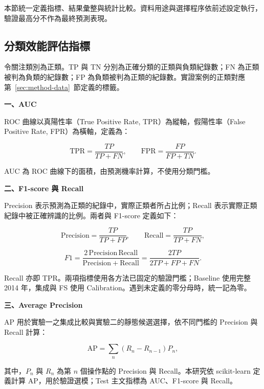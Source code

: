 本節統一定義指標、結果彙整與統計比較。資料用途與選擇程序依前述設定執行，驗證最高分不作為最終預測表現。

\subsection{分類效能評估指標}

令關注類別為正類。TP 與 TN 分別為正確分類的正類與負類紀錄數；FN 為正類被判為負類的紀錄數；FP 為負類被判為正類的紀錄數。實證案例的正類對應第~\ref{sec:method-data}~節定義的標籤。

\textbf{一、AUC}

ROC 曲線以真陽性率（True Positive Rate, TPR）為縱軸，假陽性率（False Positive Rate, FPR）為橫軸，定義為：

\begin{equation}\label{eq:method-roc}
\mathrm{TPR}=\frac{TP}{TP+FN},\qquad
\mathrm{FPR}=\frac{FP}{FP+TN}.
\end{equation}

AUC 為 ROC 曲線下的面積，由預測機率計算，不使用分類門檻。

\textbf{二、F1-score 與 Recall}

Precision 表示預測為正類的紀錄中，實際正類者所占比例；Recall 表示實際正類紀錄中被正確辨識的比例。兩者與 F1-score 定義如下：

\begin{equation}\label{eq:recall}
\mathrm{Precision}=\frac{TP}{TP+FP},\qquad
\mathrm{Recall}=\frac{TP}{TP+FN},
\end{equation}

\begin{equation}\label{eq:method-f1}
F1=\frac{2\,\mathrm{Precision}\,\mathrm{Recall}}
{\mathrm{Precision}+\mathrm{Recall}}
=\frac{2TP}{2TP+FP+FN}.
\end{equation}

Recall 亦即 TPR。兩項指標使用各方法已固定的驗證門檻；Baseline 使用完整 2014 年，集成與 FS 使用 Calibration。遇到未定義的零分母時，統一記為零。

\textbf{三、Average Precision}

AP 用於實驗一之集成比較與實驗二的靜態候選選擇，依不同門檻的 Precision 與 Recall 計算：

\begin{equation}\label{eq:method-ap}
\mathrm{AP}=\sum_n(R_n-R_{n-1})P_n,
\end{equation}

其中，\(P_n\) 與 \(R_n\) 為第 \(n\) 個操作點的 Precision 與 Recall。本研究依 scikit-learn 定義計算 AP\autocite{sklearn-ap-docs}，用於驗證選模；Test 主文指標為 AUC、F1-score 與 Recall。

